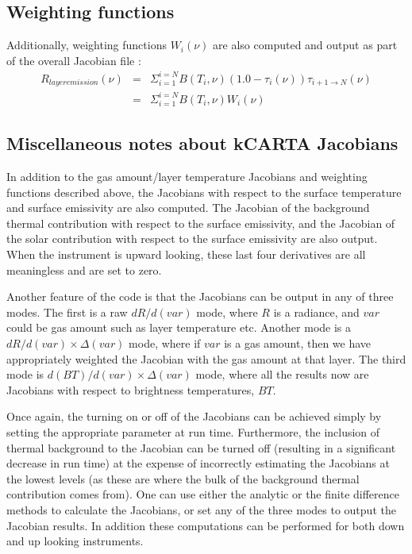 \documentclass[12pt]{article}
\begin{document}
{{{{\subsection{Weighting functions}
Additionally, weighting functions $W_{i}(\nu)$ are also computed and output 
as part of the overall Jacobian file :
\begin{eqnarray*}
R_{layer emission} (\nu) &  = &
\Sigma_{i=1}^{i=N} B(T_{i},\nu) (1.0 - \tau_{i}(\nu)) 
\tau_{i+1\rightarrow N}(\nu) \\
& = &\Sigma_{i=1}^{i=N} B(T_{i},\nu) W_{i}(\nu)
\end{eqnarray*}

\subsection{Miscellaneous notes about kCARTA Jacobians}
In addition to the gas amount/layer temperature Jacobians and
weighting functions described above, the Jacobians with respect to the
surface temperature and surface emissivity are also computed.  The
Jacobian of the background thermal contribution with respect to the
surface emissivity, and the Jacobian of the solar contribution with
respect to the surface emissivity are also output.  When the
instrument is upward looking, these last four derivatives are all
meaningless and are set to zero.

Another feature of the code is that the Jacobians can be output in any
of three modes.  The first is a raw $dR/d(var)$ mode, where $R$ is a
radiance, and $var$ could be gas amount such as layer temperature etc.
Another mode is a ${dR/d(var)} \times \Delta(var)$ mode, where if
$var$ is a gas amount, then we have appropriately weighted the
Jacobian with the gas amount at that layer.  The third mode is
${d(BT)/d(var)} \times \Delta(var)$ mode, where all the results now
are Jacobians with respect to brightness temperatures, $BT$.

Once again, the turning on or off of the Jacobians can be achieved
simply by setting the appropriate parameter at run time.  Furthermore,
the inclusion of thermal background to the Jacobian can be turned off
(resulting in a significant decrease in run time) at the expense of
incorrectly estimating the Jacobians at the lowest levels (as these
are where the bulk of the background thermal contribution comes from).
One can use either the analytic or the finite difference methods to
calculate the Jacobians, or set any of the three modes to output the
Jacobian results.  In addition these computations can be performed for
both down and up looking instruments.

}}}}
\end{document}
